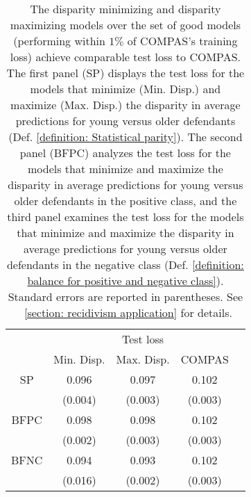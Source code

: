 \documentclass{article}
\begin{document}
\begin{table}[t]
\caption{The disparity minimizing and disparity maximizing models over the set of good models (performing within $1\%$ of COMPAS's training loss) achieve comparable test loss to COMPAS. The first panel (SP) displays the test loss for the models that minimize (Min. Disp.) and maximize (Max. Disp.) the disparity in average predictions for young versus older defendants (Def. \ref{definition: Statistical parity}). The second panel (BFPC) analyzes the test loss for the models that minimize and maximize the disparity in average predictions for young versus older defendants in the positive class, and the third panel examines the test loss for the models that minimize and maximize the disparity in average predictions for young versus older defendants in the negative class (Def. \ref{definition: balance for positive and negative class}). Standard errors are reported in parentheses. See \textsection~\ref{section: recidivism application} for details.}
\label{table: Compas Age - ref model compas Test loss}
\vskip 0.05in
\begin{center}
\begin{small}
\begin{sc}
\begin{tabular}{ccccr}
\toprule
& & Test loss & & \\
& Min. Disp. & Max. Disp.  & COMPAS \\
\midrule
SP & 0.096 & 0.097 & 0.102 \\
& (0.004) & (0.003) & (0.003) \\
\midrule 
BFPC & 0.098 & 0.098 & 0.102 \\
& (0.002) & (0.003) & (0.003) \\
\midrule
BFNC & 0.094 & 0.093 & 0.102 \\
& (0.016) & (0.002) & (0.003) \\
\bottomrule
\end{tabular}
\end{sc}
\end{small}
\end{center}
\vskip -0.1in
\end{table}
\end{document}
